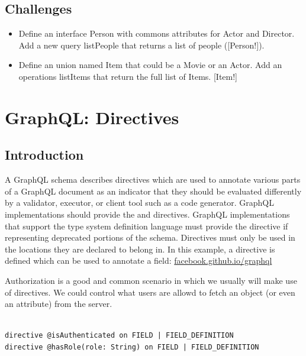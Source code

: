 \documentclass[]{book}
\providecommand{\tightlist}{%
  \setlength{\itemsep}{0pt}\setlength{\parskip}{0pt}}
\begin{document}
\section{Challenges}\label{challenges-3}

\begin{itemize}
\tightlist
\item
  Define an interface Person with commons attributes for Actor and
  Director. Add a new query listPeople that returns a list of people
  ({[}Person!{]}).
\item
  Define an union named Item that could be a Movie or an Actor. Add an
  operations listItems that return the full list of Items. {[}Item!{]}
\end{itemize}

\chapter{GraphQL: Directives}\label{graphql-directives}

\section{Introduction}\label{introduction-4}

A GraphQL schema describes directives which are used to annotate various
parts of a GraphQL document as an indicator that they should be
evaluated differently by a validator, executor, or client tool such as a
code generator. GraphQL implementations should provide the \citet{skip}
and \citet{include} directives. GraphQL implementations that support the
type system definition language must provide the \citet{deprecated}
directive if representing deprecated portions of the schema. Directives
must only be used in the locations they are declared to belong in. In
this example, a directive is defined which can be used to annotate a
field:
\href{https://facebook.github.io/graphql/draft/\#sec-Type-System.Directives}{facebook.github.io/graphql}

Authorization is a good and common scenario in which we usually will
make use of directives. We could control what users are allowd to fetch
an object (or even an attribute) from the server.

\begin{verbatim}

directive @isAuthenticated on FIELD | FIELD_DEFINITION
directive @hasRole(role: String) on FIELD | FIELD_DEFINITION

\end{verbatim}
\end{document}
